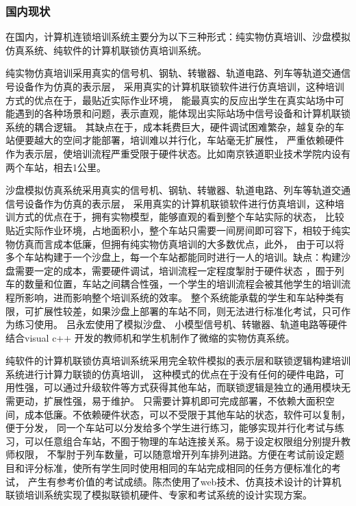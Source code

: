 \subsubsection{国内现状}

在国内，计算机连锁培训系统主要分为以下三种形式：纯实物仿真培训、沙盘模拟仿真系统\cite{电气化铁路信号计算机联锁实训系统研究与设计}、纯软件的计算机联锁仿真培训系统。

纯实物仿真培训采用真实的信号机、钢轨、转辙器、轨道电路、列车等轨道交通信号设备作为仿真的表示层，
采用真实的计算机联锁软件进行仿真培训，这种培训方式的优点在于，最贴近实际作业环境，
能最真实的反应出学生在真实站场中可能遇到的各种场景和问题，表示直观，能体现出实际站场中信号设备和计算机联锁系统的耦合逻辑。
其缺点在于，成本耗费巨大，硬件调试困难繁杂，越复杂的车站便要越大的空间才能部署，培训难以并行化，车站毫无扩展性，
严重依赖硬件作为表示层，使培训流程严重受限于硬件状态。比如南京铁道职业技术学院内设有两个车站，相去1公里。

沙盘模拟仿真系统采用真实的信号机、钢轨、转辙器、轨道电路、列车等轨道交通信号设备作为仿真的表示层，
采用真实的计算机联锁软件进行仿真培训，这种培训方式的优点在于，拥有实物模型，能够直观的看到整个车站实际的状态，
比较贴近实际作业环境，占地面积小，整个车站只需要一间房间即可容下，相较于纯实物仿真而言成本低廉，但拥有纯实物仿真培训的大多数优点，此外，
由于可以将多个车站构建于一个沙盘上，每一个车站都能同时进行一人的培训。缺点：构建沙盘需要一定的成本，需要硬件调试，培训流程一定程度掣肘于硬件状态
，囿于列车的数量和位置，车站之间耦合性强，一个学生的培训流程会被其他学生的培训流程所影响，进而影响整个培训系统的效率。
整个系统能承载的学生和车站种类有限，可扩展性较差，如果沙盘上部署的车站不同，则无法进行标准化考试，只可作为练习使用。
吕永宏使用了模拟沙盘、 小模型信号机、转辙器、轨道电路等硬件结合visual c++ 开发的教师机和学生机制作了微缩的实物仿真系统\cite{lyh}。

纯软件的计算机联锁仿真培训系统采用完全软件模拟的表示层和联锁逻辑构建培训系统进行计算力联锁的仿真培训，
这种模式的优点在于没有任何的硬件电路，可用性强，可以通过升级软件等方式获得其他车站，而联锁逻辑是独立的通用模块无需更动，扩展性强，易于维护。
只需要计算机即可完成部署，不依赖大面积空间，成本低廉。不依赖硬件状态，可以不受限于其他车站的状态，软件可以复制，便于分发，
同一个车站可以分发给多个学生进行练习，能够实现并行化考试与练习，可以任意组合车站，不囿于物理的车站连接关系。易于设定权限组分别提升教师权限，
不掣肘于列车数量，可以随意增开列车排列进路。方便在考试前设定题目和评分标准，使所有学生同时使用相同的车站完成相同的任务方便标准化的考试，
产生有参考价值的考试成绩。陈杰使用了web技术、仿真技术设计的计算机联锁培训系统实现了模拟联锁机硬件、专家和考试系统的设计实现方案\cite{cj}。

